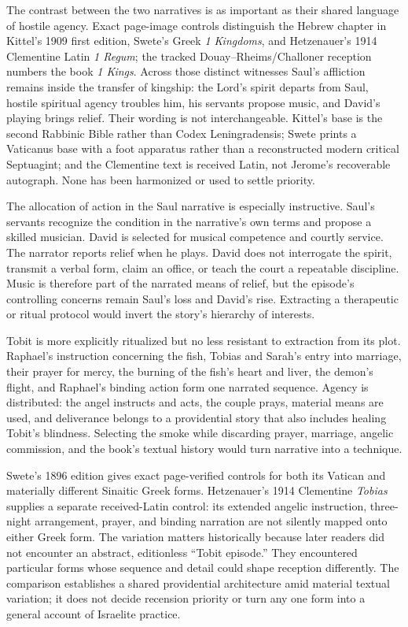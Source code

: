 The contrast between the two narratives is as important as their shared
language of hostile agency. Exact page-image controls distinguish the Hebrew
chapter in Kittel's 1909 first edition, Swete's Greek \emph{1 Kingdoms}, and
Hetzenauer's 1914 Clementine Latin \emph{1 Regum}; the tracked
Douay--Rheims/Challoner reception numbers the book \emph{1 Kings}. Across
those distinct witnesses Saul's affliction remains inside the transfer of
kingship: the Lord's spirit departs from Saul, hostile spiritual agency
troubles him, his servants propose music, and David's playing brings relief.
Their wording is not interchangeable. Kittel's base is the second Rabbinic
Bible rather than Codex Leningradensis; Swete prints a Vaticanus base with a
foot apparatus rather than a reconstructed modern critical Septuagint; and the
Clementine text is received Latin, not Jerome's recoverable autograph. None
has been harmonized or used to settle priority.

The allocation of action in the Saul narrative is especially instructive.
Saul's servants recognize the condition in the narrative's own terms and
propose a skilled musician. David is selected for musical competence and
courtly service. The narrator reports relief when he plays. David does not
interrogate the spirit, transmit a verbal form, claim an office, or teach the
court a repeatable discipline. Music is therefore part of the narrated means
of relief, but the episode's controlling concerns remain Saul's loss and
David's rise. Extracting a therapeutic or ritual protocol would invert the
story's hierarchy of interests.

Tobit is more explicitly ritualized but no less resistant to extraction from
its plot. Raphael's instruction concerning the fish, Tobias and Sarah's entry
into marriage, their prayer for mercy, the burning of the fish's heart and
liver, the demon's flight, and Raphael's binding action form one narrated
sequence. Agency is distributed: the angel instructs and acts, the couple
prays, material means are used, and deliverance belongs to a providential
story that also includes healing Tobit's blindness. Selecting the smoke while
discarding prayer, marriage, angelic commission, and the book's textual
history would turn narrative into a technique.

Swete's 1896 edition gives exact page-verified controls for both its Vatican
and materially different Sinaitic Greek forms. Hetzenauer's 1914 Clementine
\emph{Tobias} supplies a separate received-Latin control: its extended angelic
instruction, three-night arrangement, prayer, and binding narration are not
silently mapped onto either Greek form. The variation matters historically
because later readers did not encounter an abstract, editionless ``Tobit
episode.'' They encountered particular forms whose sequence and detail could
shape reception differently. The comparison establishes a shared
providential architecture amid material textual variation; it does not decide
recension priority or turn any one form into a general account of Israelite
practice.

